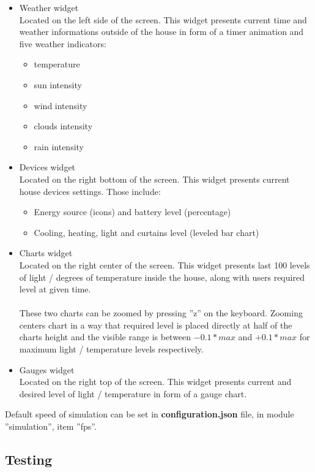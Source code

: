 \documentclass{article}
\begin{document}
\begin{itemize}
    \item Weather widget \\
    Located on the left side of the screen. This widget presents current time and weather informations outside of the house in form of a timer animation and five weather indicators: 
    \begin{itemize}
        \item temperature
        \item sun intensity
        \item wind intensity
        \item clouds intensity
        \item rain intensity
    \end{itemize}
    \item Devices widget \\
    Located on the right bottom of the screen. This widget presents current house devices settings. Those include:
    \begin{itemize}
       \item Energy source (icons) and battery level (percentage)
       \item Cooling, heating, light and curtains level (leveled bar chart) 
    \end{itemize}
    \item Charts widget \\
    Located on the right center of the screen. This widget presents last 100 levels of light / degrees of temperature inside the house, along with users required level at given time. \\\\
    These two charts can be zoomed by pressing ''z'' on the keyboard. Zooming centers chart in a way that required level is placed directly at half of the charts height and the visible range is between $-0.1 * max$ and $+0.1 * max$ for maximum light / temperature levels respectively.
    \item Gauges widget \\
    Located on the right top of the screen. This widget presents current and desired level of light / temperature in form of a gauge chart.
\end{itemize}

Default speed of simulation can be set in \textbf{configuration.json} file, in module ''simulation'', item ''fps''.

\subsection{Testing}
\end{document}
